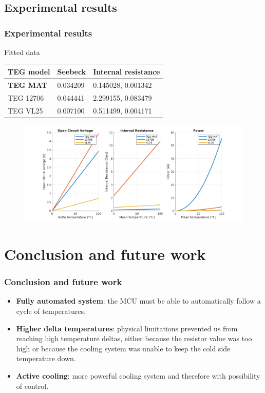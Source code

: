 \subsection{Experimental results}
\begin{frame}
    \frametitle{Experimental results}
\begin{block}{Fitted data}
    \vspace{2mm}
    \begin{tabular}{ |p{2cm}|p{2.2cm}|p{2.8cm}|  }
    \hline
    TEG model & Seebeck & Internal resistance \\ [0.5ex] 
    \hline
    \hline
    \textbf{TEG MAT} & 0.034209 & 0.145028, 0.001342\\
    \hline
    TEG 12706 & 0.044441 & 2.299155, 0.083479\\
    \hline
    TEG VL25  & 0.007100 & 0.511499, 0.004171\\
    \hline
\end{tabular}

\begin{figure}
    \centering
    \includegraphics[width=1.0\textwidth]{images/TEGcomparison.png}
\end{figure}
\end{block}
\end{frame}

\section{Conclusion and future work}
\begin{frame}
    \frametitle{Conclusion and future work}
\begin{itemize}
    \item \textbf{Fully automated system}: the MCU must be able to automatically follow a cycle of temperatures.
    \item \textbf{Higher delta temperatures}: physical limitations prevented us from reaching high temperature deltas, either because the resistor value was too high or because the cooling system was unable to keep the cold side temperature down. 
    \item \textbf{Active cooling}: more powerful cooling system and therefore with possibility of control. 
\end{itemize}
\end{frame}
